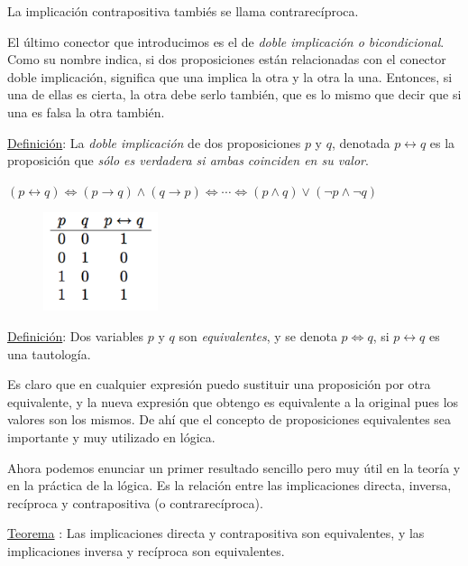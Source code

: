La implicación contrapositiva tambiés se llama contrarecíproca.

El último conector que introducimos es el de \emph{doble implicación o bicondicional}. Como su nombre indica, si dos proposiciones están relacionadas con el conector doble implicación, significa que una implica la otra y la otra la una. Entonces, si una de ellas es cierta, la otra debe serlo también, que es lo mismo que decir que si una es falsa la otra también.

\begin{multicols}{2}
\underline{Definición}: La \emph{doble implicación} de dos proposiciones $p$ y $q$, denotada $p \leftrightarrow q$ es la proposición que \emph{sólo es verdadera si ambas coinciden en su valor}.

 $(p \leftrightarrow q) \Leftrightarrow  (p \to  q) \wedge (q \to  p) \Leftrightarrow \cdots    \Leftrightarrow (p \wedge q) \vee ( \neg p \wedge \neg q)$

	\begin{figure}[H] 
		\centering
		\includegraphics[width=0.3\textwidth]{imagenes/apendices/APENDICESIM18.png}
	\end{figure}
\end{multicols}

\underline{Definición}: Dos variables $p$ y $q$ son \emph{equivalentes}, y se denota $ p \Leftrightarrow q$, si $p \leftrightarrow q$ es una tautología.

Es claro que en cualquier expresión puedo sustituir una proposición por otra equivalente, y la nueva expresión que obtengo es equivalente a la original pues los valores son los mismos. De ahí que el concepto de proposiciones equivalentes sea importante y muy utilizado en lógica.

Ahora podemos enunciar un primer resultado sencillo pero muy útil en la teoría y en la práctica de la lógica. Es la relación entre las implicaciones directa, inversa, recíproca y contrapositiva (o contrarecíproca).

\underline{Teorema} : Las implicaciones directa y contrapositiva son equivalentes, y las implicaciones inversa y recíproca son equivalentes.

